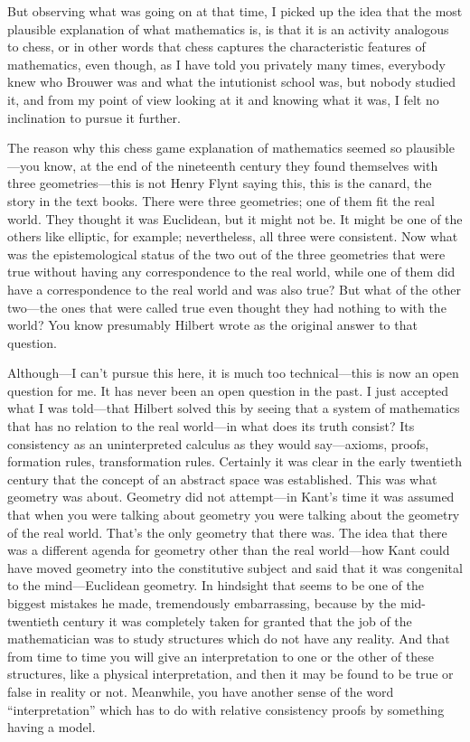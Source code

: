 But observing what was going on at that time, I picked up the idea 
that the most plausible explanation of what mathematics is, is that it is 
an activity analogous to chess, or in other words that chess captures the 
characteristic features of mathematics, even though, as I have told you 
privately many times, everybody knew who Brouwer was and what the 
intutionist school was, but nobody studied it, and from my point of 
view looking at it and knowing what it was, I felt no inclination to 
pursue it further. 

The reason why this chess game explanation of mathematics 
seemed so plausible---you know, at the end of the nineteenth century 
they found themselves with three geometries---this is not Henry Flynt 
saying this, this is the canard, the story in the text books. There were 
three geometries; one of them fit the real world. They thought it was 
Euclidean, but it might not be. It might be one of the others like elliptic, 
for example; nevertheless, all three were consistent. Now what was the 
epistemological status of the two out of the three geometries that were 
true without having any correspondence to the real world, while one of 
them did have a correspondence to the real world and was also true? 
But what of the other two---the ones that were called true even thought 
they had nothing to with the world? You know presumably Hilbert 
wrote  as the original answer to that 
question. 

Although---I can't pursue this here, it is much too technical---this 
is now an open question for me. It has never been an open question in 
the past. I just accepted what I was told---that Hilbert solved this by 
seeing that a system of mathematics that has no relation to the real 
world---in what does its truth consist? Its consistency as an uninterpreted 
calculus as they would say---axioms, proofs, formation rules, 
transformation rules. Certainly it was clear in the early twentieth 
century that the concept of an abstract space was established. This was 
what geometry was about. Geometry did not attempt---in Kant's time it 
was assumed that when you were talking about geometry you were 
talking about the geometry of the real world. That's the only geometry 
that there was. The idea that there was a different agenda for geometry 
other than the real world---how Kant could have moved geometry into 
the constitutive subject and said that it was congenital to the mind---Euclidean geometry. 
In hindsight that seems to be one of the biggest 
mistakes he made, tremendously embarrassing, because by the mid-twentieth 
century it was completely taken for granted that the job of the 
mathematician was to study structures which do not have any reality. 
And that from time to time you will give an interpretation to one or the 
other of these structures, like a physical interpretation, and then it may 
be found to be true or false in reality or not. Meanwhile, you have 
another sense of the word \enquote{interpretation} which has to do with relative 
consistency proofs by something having a model. 

